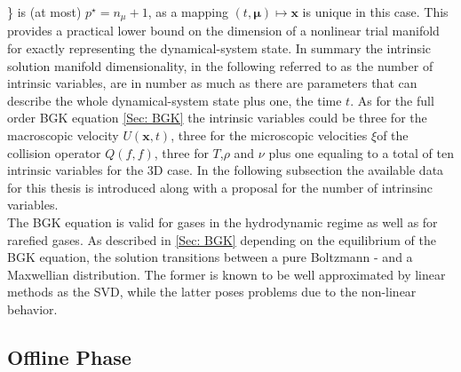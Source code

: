 \documentclass[12pt, a4paper]{article}
\begin{document}
\mu \in {}\}\) is (at most) \(p^{\star} = n_{\mu} + 1\), as a mapping \((t,\mathbf{\mu})\mapsto \mathbf{x}\) is unique in this case. This provides a practical lower bound on the dimension of a nonlinear trial manifold for exactly representing the dynamical-system state. In summary the intrinsic solution manifold dimensionality, in the following referred to as the number of intrinsic variables, are in number as much as there are parameters that can describe the whole dynamical-system state plus one, the time \(t\). As for the full order BGK equation \cref{Sec: BGK} the intrinsic variables could be three for the macroscopic velocity \(U(\mathbf{x},t)\), three for the microscopic velocities \(\xi\)of the collision operator \(Q(f,f)\), three for \(T\),\(\rho\) and \(\nu\) plus one equaling to a total of ten intrinsic variables for the 3D case. In the following subsection the available data for this thesis is introduced along with a proposal for the number of intrinsinc variables.\\
The BGK equation is valid for gases in the hydrodynamic regime as well as for rarefied gases. As described in \cref{Sec: BGK} depending on the equilibrium of the BGK equation, the solution transitions between a pure Boltzmann - and a Maxwellian distribution. The former is known to be well approximated by linear methods as the SVD, while the latter poses problems due to the non-linear behavior.
\subsection{Offline Phase}
\end{document}
